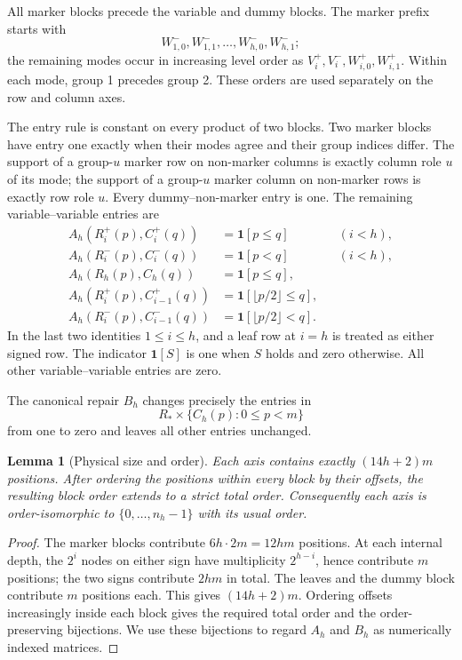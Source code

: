\documentclass[11pt]{article}
\newtheorem{lemma}[theorem]{Lemma}
\newcommand{\ind}{\mathbf1}
\begin{document}
All marker blocks precede the variable and dummy blocks. The marker prefix
starts with
\[
 W_{1,0}^-,W_{1,1}^-,\ldots,W_{h,0}^-,W_{h,1}^-;
\]
the remaining modes occur in increasing level order as
$V_i^+,V_i^-,W_{i,0}^+,W_{i,1}^+$. Within each mode, group 1 precedes
group 2. These orders are used separately on the row and column axes.

The entry rule is constant on every product of two blocks. Two marker
blocks have entry one exactly when their modes agree and their group
indices differ. The support of a group-$u$ marker row on non-marker columns
is exactly column role $u$ of its mode; the support of a group-$u$ marker
column on non-marker rows is exactly row role $u$. Every dummy--non-marker
entry is one. The remaining
variable--variable entries are
\begin{align}\label{eq:values}
 A_h(R_i^+(p),C_i^+(q))&=\ind[p\le q] &&(i<h),\nonumber\\
 A_h(R_i^-(p),C_i^-(q))&=\ind[p<q] &&(i<h),\nonumber\\
 A_h(R_h(p),C_h(q))&=\ind[p\le q],\\
 A_h(R_i^+(p),C_{i-1}^+(q))&=\ind[\lfloor p/2\rfloor\le q],\nonumber\\
 A_h(R_i^-(p),C_{i-1}^-(q))&=\ind[\lfloor p/2\rfloor<q].\nonumber
\end{align}
In the last two identities $1\le i\le h$, and a leaf row at $i=h$ is
treated as either signed row. The indicator $\ind[S]$ is one when $S$
holds and zero otherwise.
All other variable--variable entries are zero.

The canonical repair $B_h$ changes precisely the entries in
\[
 R_*\times\{C_h(p):0\le p<m\}
\]
from one to zero and leaves all other entries unchanged.

\begin{lemma}[Physical size and order]\label{lem:size}
Each axis contains exactly $(14h+2)m$ positions. After ordering the
positions within every block by their offsets, the resulting block order
extends to a strict total order. Consequently each axis is order-isomorphic
to $\{0,\ldots,n_h-1\}$ with its usual order.
\end{lemma}
\begin{proof}
The marker blocks contribute $6h\cdot2m=12hm$ positions. At each internal
depth, the $2^i$ nodes on either sign have multiplicity $2^{h-i}$, hence
contribute $m$ positions; the two signs contribute $2hm$ in total. The
leaves and the dummy block contribute $m$ positions each. This gives
$(14h+2)m$. Ordering offsets increasingly inside each block gives the
required total order and the order-preserving bijections. We use these
bijections to regard $A_h$ and $B_h$ as numerically indexed matrices.
\end{proof}
\end{document}
